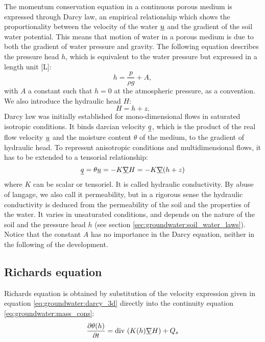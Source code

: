 The momentum conservation equation in a continuous porous medium is expressed through Darcy law,
an empirical relationship which shows the proportionality between the velocity of the water $\underline{u}$ and the gradient of the soil water potential.
This means that motion of water in a porous medium is due to both the gradient of water pressure and gravity.
The following equation describes the pressure head $h$, which is equivalent to the water pressure but expressed in a length unit [L]:
\begin{equation}
\label{eq:groundwater:definition_h}
h=\dfrac{p}{\rho g} + A,
\end{equation}
with $A$ a constant such that $h = 0$ at the atmospheric pressure, as a convention.
We also introduce the hydraulic head $H$:
\begin{equation}
\label{eq:groundwater:definition_h_2}
H = h + z.
\end{equation}
%
Darcy law was initially established for mono-dimensional flows in saturated isotropic conditions.
It binds darcian velocity $\underline{q}$, which is the product of the real flow velocity
$\underline{u}$ and the moisture content $\theta$ of the medium, to the gradient of hydraulic head.
To represent anisotropic conditions and multidimensional flows, it has to be extended to a tensorial relationship:
\begin{equation}
\label{eq:groundwater:darcy_3d}
\underline{q} = \theta \underline{ u} = -K \underline{\nabla} H = -K \underline{\nabla} (h + z)
\end{equation}
where $K$ can be scalar or tensoriel. It is called hydraulic conductivity. By abuse of langage, we also call it permeability, but in a rigorous sense the hydraulic conductivity
is deduced from the permeability of the soil and the properties of the water.
It varies in unsaturated conditions, and depends on the nature of the soil and the pressure head $h$ (see section \ref{sec:groundwater:soil_water_laws}).
Notice that the constant $A$ has no importance in the Darcy equation, neither in the following of the development.

\subsection{Richards equation}

Richards equation is obtained by substitution of the velocity expression given in equation \eqref{eq:groundwater:darcy_3d} directly into
the continuity equation \eqref{eq:groundwater:mass_cons}:
\begin{equation}
\label{eq:groundwater:richards}
\frac{\partial{\theta(h)}}{\partial{t}} = \text{div}\, \left( K(h) \underline{\nabla} H \right) + Q_s
\end{equation}

